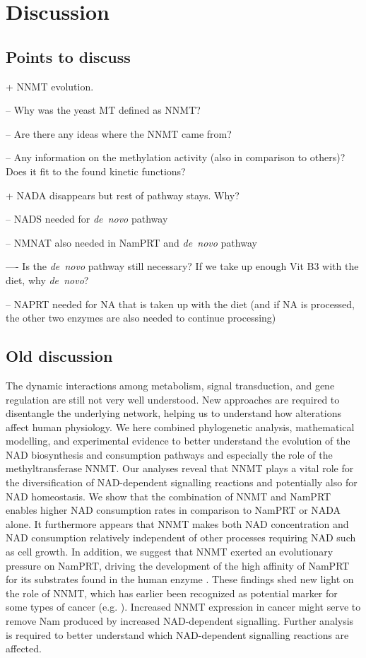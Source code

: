 
\section{Discussion}

\subsection{Points to discuss}

+ NNMT evolution.

-- Why was the yeast MT defined as NNMT?

-- Are there any ideas where the NNMT came from?

-- Any information on the methylation activity (also in comparison to others)? Does it fit to the found kinetic functions?

+ NADA disappears but rest of pathway stays. Why?

-- NADS needed for \textit{de~novo} pathway

-- NMNAT also needed in NamPRT and \textit{de~novo} pathway

---- Is the \textit{de~novo} pathway still necessary? If we take up enough Vit B3 with the diet, why \textit{de~novo}?

-- NAPRT needed for NA that is taken up with the diet (and if NA is processed, the other two enzymes are also needed to continue processing)


\subsection{Old discussion}

The dynamic interactions among metabolism, signal transduction, and gene regulation are still not very well understood. New approaches are required to disentangle the underlying network, helping us to understand how alterations affect human physiology. We here combined phylogenetic analysis, mathematical modelling, and experimental evidence to better understand the evolution of the NAD biosynthesis and consumption pathways and especially the role of the methyltransferase NNMT. Our analyses reveal that NNMT plays a vital role for the diversification of NAD-dependent signalling reactions and potentially also for NAD homeostasis. We show that the combination of NNMT and NamPRT enables higher NAD consumption rates in comparison to NamPRT or NADA alone. It furthermore appears that NNMT makes both NAD concentration and NAD consumption relatively independent of other processes requiring NAD such as cell growth. In addition, we suggest that NNMT exerted an evolutionary pressure on NamPRT, driving the development of the high affinity of NamPRT for its substrates found in the human enzyme \cite{Burgos2008}. These findings shed new light on the role of NNMT, which has earlier been recognized as potential marker for some types of cancer (e.g. \cite{Okamura1998}). Increased NNMT expression in cancer might serve to remove Nam produced by increased NAD-dependent signalling. Further analysis is required to better understand which NAD-dependent signalling reactions are affected.

